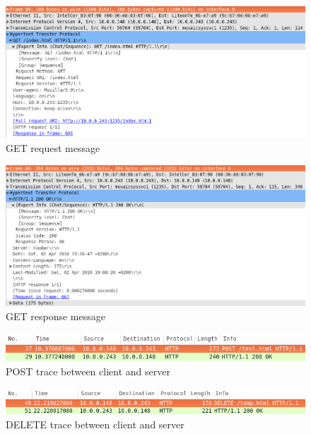 \documentclass[10pt,twocolumn]{witseiepaper}
\begin{document}
		\begin{figure}[h!]
			\centering
			\includegraphics[width=\columnwidth]{resources/message_get_html}
			\caption{GET request message}
			\label{fig:basic_get_message}
		\end{figure}
		
		\begin{figure}[h!]
			\centering
			\includegraphics[width=\columnwidth]{resources/message_get_response_html}
			\caption{GET response message}
			\label{fig:basic_get_response}
		\end{figure}
		
		\begin{figure}[h!]
			\centering
			\includegraphics[width=\columnwidth]{resources/post_request}
			\caption{POST trace between client and server}
			\label{fig:basic_post}
		\end{figure}
		
		\begin{figure}[h!]
			\centering
			\includegraphics[width=\columnwidth]{resources/delete_request}
			\caption{DELETE trace between client and server}
			\label{fig:basic_delete}
		\end{figure}
		
\end{document}
